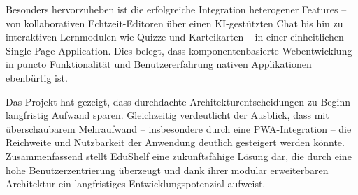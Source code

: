 Besonders hervorzuheben ist die erfolgreiche Integration heterogener Features -- von kollaborativen Echtzeit-Editoren über einen KI-gestützten Chat bis hin zu interaktiven Lernmodulen wie Quizze und Karteikarten -- in einer einheitlichen Single Page Application. Dies belegt, dass komponentenbasierte Webentwicklung in puncto Funktionalität und Benutzererfahrung nativen Applikationen ebenbürtig ist.
\newline

Das Projekt hat gezeigt, dass durchdachte Architekturentscheidungen zu Beginn langfristig Aufwand sparen. Gleichzeitig verdeutlicht der Ausblick, dass mit überschaubarem Mehraufwand -- insbesondere durch eine PWA-Integration -- die Reichweite und Nutzbarkeit der Anwendung deutlich gesteigert werden könnte. Zusammenfassend stellt EduShelf eine zukunftsfähige Lösung dar, die durch eine hohe Benutzerzentrierung überzeugt und dank ihrer modular erweiterbaren Architektur ein langfristiges Entwicklungspotenzial aufweist.
